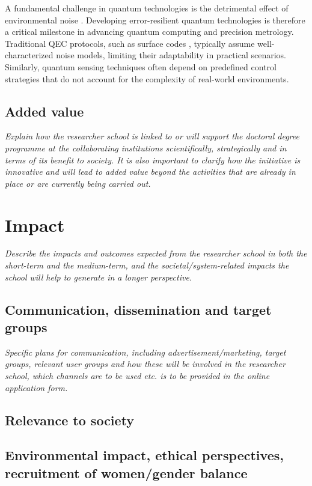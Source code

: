 \documentclass{scrreprt}
\begin{document}
A fundamental challenge in quantum technologies is the detrimental
effect of environmental noise \cite{gardiner_quantum_2004}. Developing
error-resilient quantum technologies is therefore a critical milestone
in advancing quantum computing and precision metrology. Traditional
QEC protocols, such as surface codes \cite{fowler_surface_2012},
typically assume well-characterized noise models, limiting their
adaptability in practical scenarios. Similarly, quantum sensing
techniques often depend on predefined control strategies that do not
account for the complexity of real-world environments.

\subsection{Added value}

{\em Explain how the researcher school is linked to or will support the
doctoral degree programme at the collaborating institutions
scientifically, strategically and in terms of its benefit to
society. It is also important to clarify how the initiative is
innovative and will lead to added value beyond the activities that are
already in place or are currently being carried out.}

\section{Impact}


{\em Describe the impacts and outcomes expected from the researcher school
in both the short-term and the medium-term, and the
societal/system-related impacts the school will help to generate in a
longer perspective.}

\subsection{Communication, dissemination and target groups}

{\em Specific plans for communication, including advertisement/marketing,
target groups, relevant user groups and how these will be involved in
the researcher school, which channels are to be used etc. is to be
provided in the online application form.}

\subsection{Relevance to society}


\subsection{Environmental impact, ethical perspectives, recruitment of women/gender balance }
\end{document}
